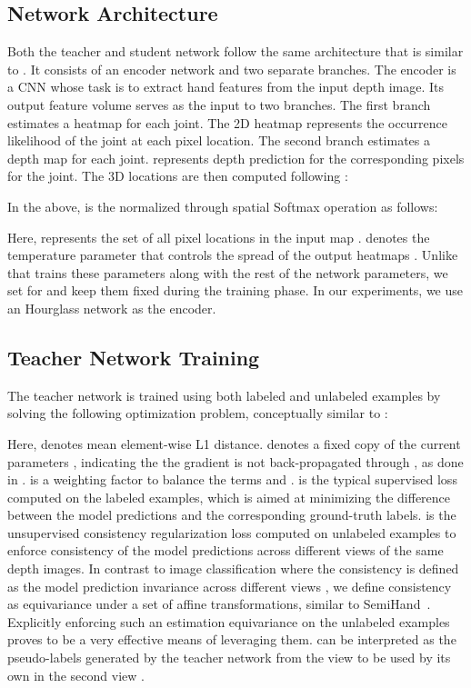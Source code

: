 \documentclass{article}
\begin{document}
\subsection{Network Architecture}
Both the teacher and student network follow the same architecture that is similar to \cite{iqbal2018hand}. It consists of an encoder network and two separate branches. The encoder is a CNN whose task is to extract hand features from the input depth image. Its output feature volume serves as the input to two branches. The first branch estimates a heatmap  for each joint.  The 2D heatmap  represents the occurrence likelihood of the  joint at each pixel location. The second branch estimates a depth map  for each joint.  represents depth prediction for the corresponding pixels for the  joint. The 3D locations are then computed following \cite{sun2018integral,iqbal2018hand}:




In the above,  is the  normalized through spatial Softmax operation as follows:

Here,  represents the set of all pixel locations in the input map .  denotes the temperature parameter that controls the spread of the output heatmaps . Unlike \cite{iqbal2018hand} that trains these parameters along with the rest of the network parameters, we set  for  and keep them fixed during the training phase. In our experiments, we use an Hourglass network \cite{newell2016stacked} as the encoder.




\subsection{Teacher Network Training}
The teacher network is trained using both labeled and unlabeled examples by solving the following optimization problem, conceptually similar to \cite{xie2019unsupervised,yang2021semihand}:  



Here,  denotes mean element-wise L1 distance.  denotes a fixed copy of the current parameters , indicating the the gradient is not back-propagated through , as done in \cite{xie2019unsupervised,miyato2018virtual}.  is a weighting factor to balance the terms  and .  is the typical supervised loss computed on the labeled examples, which is aimed at minimizing the difference between the model predictions and the corresponding ground-truth labels.  is the unsupervised consistency regularization loss computed on unlabeled examples to enforce consistency of the model predictions across different views of the same depth images. In contrast to image classification where the consistency is defined as the model prediction invariance across different views \cite{xie2019unsupervised}, we define consistency as equivariance under a set of affine transformations, similar to SemiHand~\cite{yang2021semihand}. Explicitly enforcing such an estimation equivariance on the unlabeled examples proves to be a very effective means of leveraging them.  can be interpreted as the pseudo-labels generated by the teacher network from the view  to be used by its own in the second view .
\end{document}
